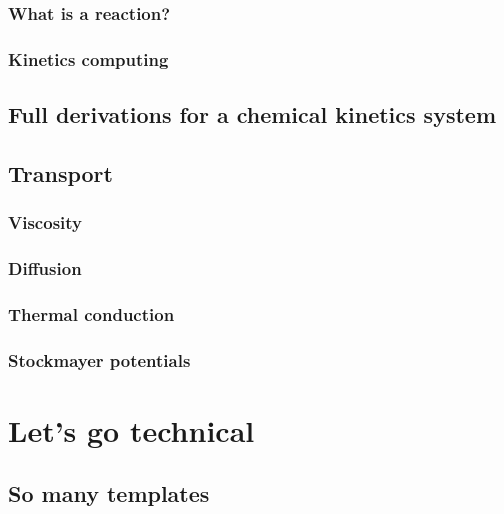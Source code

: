 \documentclass[twoside]{report}
\begin{document}
\subsection{What is a reaction?}
\label{kinetics_gen}


\subsection{Kinetics computing}
\label{kinetics_comput}


\section{Full derivations for a chemical kinetics system}
\label{derivations}


\section{Transport}
\label{transport}

\subsection{Viscosity}
\label{transport:viscosity}


\subsection{Diffusion}
\label{transport:diffusion}


\subsection{Thermal conduction}
\label{transport:thermal}


\subsection{Stockmayer potentials}
\label{transport:Stockmayer}


\chapter{Let's go technical}
\chaptermark{\ANTIOCHTech}
\label{Antioch:technique}

\section{So many templates}
\end{document}
